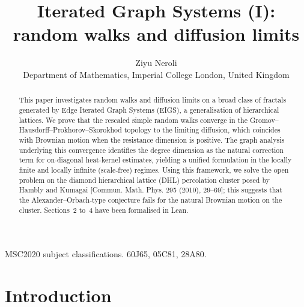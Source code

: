 \documentclass{article}
\theoremstyle{plain}
\theoremstyle{definition}
\begin{document}
\title{Iterated Graph Systems (I): random walks and diffusion limits}

\author{Ziyu Neroli \\
\small{Department of Mathematics, Imperial College London, United Kingdom}
}
\date{}


\maketitle

\begin{abstract}
This paper investigates random walks and diffusion limits on a broad class of fractals generated by Edge Iterated Graph Systems (EIGS), a generalisation of hierarchical lattices.
We prove that the rescaled simple random walks converge in the Gromov--Hausdorff--Prokhorov--Skorokhod topology to the limiting diffusion, which coincides with Brownian motion when the resistance dimension is positive.
The graph analysis underlying this convergence identifies the degree dimension as the natural correction term for on-diagonal heat-kernel estimates, yielding a unified formulation in the locally finite and locally infinite (scale-free) regimes.
Using this framework, we solve the open problem on the diamond hierarchical lattice (DHL) percolation cluster posed by Hambly and Kumagai [Commun. Math. Phys. 295 (2010), 29--69]; this suggests that the Alexander--Orbach-type conjecture fails for the natural Brownian motion on the cluster.
Sections~2 to~4 have been formalised in Lean.

\end{abstract}







MSC2020 subject classifications. 60J65, 05C81, 28A80.


\tableofcontents


\section{Introduction}\label{sec:intro}
\end{document}
